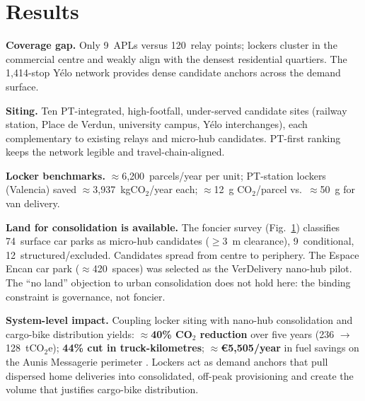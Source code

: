 \documentclass[10pt,a4paper,twocolumn]{article}
\begin{document}
\section{Results}

\textbf{Coverage gap.} Only 9~APLs versus 120~relay points; lockers cluster in the
commercial centre and weakly align with the densest residential quartiers. The
1,414-stop Yélo network provides dense candidate anchors across the demand surface.

\textbf{Siting.} Ten PT-integrated, high-footfall, under-served candidate sites
(railway station, Place de Verdun, university campus, Yélo interchanges), each
complementary to existing relays and micro-hub candidates. PT-first ranking keeps
the network legible and travel-chain-aligned.

\textbf{Locker benchmarks.} $\approx$6,200~parcels/year per unit; PT-station
lockers (Valencia) saved $\approx$3,937~kgCO$_2$/year each; $\approx$12~g
CO$_2$/parcel vs.\ $\approx$50~g for van delivery.

\textbf{Land for consolidation is available.} The foncier survey (Fig.~\ref{fig:map})
classifies 74~surface car parks as micro-hub candidates ($\geq$3~m clearance),
9~conditional, 12~structured/excluded. Candidates spread from centre to periphery.
The Espace Encan car park ($\approx$420~spaces) was selected as the VerDelivery
nano-hub pilot. The ``no land'' objection to urban consolidation does not hold here:
the binding constraint is governance, not foncier.

\begin{figure}[h]
  \centering
  \label{fig:map}
\end{figure}

\textbf{System-level impact.} Coupling locker siting with nano-hub consolidation
and cargo-bike distribution yields: $\approx$\textbf{40\% CO$_2$ reduction} over
five years (236 $\to$ 128~tCO$_2$e); \textbf{44\% cut in truck-kilometres};
$\approx$\textbf{\euro{}5,505/year} in fuel savings on the Aunis Messagerie
perimeter \citep{eigsi2026}. Lockers act as demand anchors that pull dispersed home
deliveries into consolidated, off-peak provisioning and create the volume that
justifies cargo-bike distribution.
\end{document}
